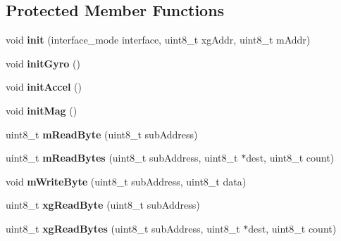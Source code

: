 \subsection*{Protected Member Functions}
\begin{DoxyCompactItemize}
\item 
\mbox{\label{classLSM9DS1_aa4f74e09e93c0133dc30545d4492849e}} 
void {\bfseries init} (interface\+\_\+mode interface, uint8\+\_\+t xg\+Addr, uint8\+\_\+t m\+Addr)
\item 
\mbox{\label{classLSM9DS1_a66a7b02acb28964ffc9362f25988e270}} 
void {\bfseries init\+Gyro} ()
\item 
\mbox{\label{classLSM9DS1_a143ff5abf4f7ba8e1c42325859106f84}} 
void {\bfseries init\+Accel} ()
\item 
\mbox{\label{classLSM9DS1_a492aa6edcf891f273d932636e3cc470d}} 
void {\bfseries init\+Mag} ()
\item 
\mbox{\label{classLSM9DS1_ae4e470321567e4f93fc09f4cc6cd9efa}} 
uint8\+\_\+t {\bfseries m\+Read\+Byte} (uint8\+\_\+t sub\+Address)
\item 
\mbox{\label{classLSM9DS1_ab76297373f1d5306ec1e31796ec5ec24}} 
uint8\+\_\+t {\bfseries m\+Read\+Bytes} (uint8\+\_\+t sub\+Address, uint8\+\_\+t $\ast$dest, uint8\+\_\+t count)
\item 
\mbox{\label{classLSM9DS1_afc171c924102c97fa1d88fa7f48bd167}} 
void {\bfseries m\+Write\+Byte} (uint8\+\_\+t sub\+Address, uint8\+\_\+t data)
\item 
\mbox{\label{classLSM9DS1_af7f9789df6f0178764c815a3380c202a}} 
uint8\+\_\+t {\bfseries xg\+Read\+Byte} (uint8\+\_\+t sub\+Address)
\item 
\mbox{\label{classLSM9DS1_a0a5745b603a751b50317cd2551e06cac}} 
uint8\+\_\+t {\bfseries xg\+Read\+Bytes} (uint8\+\_\+t sub\+Address, uint8\+\_\+t $\ast$dest, uint8\+\_\+t count)
\item 
\mbox{\label{classLSM9DS1_a263eed4b52ad087a1195755c6ba49e62}} 

\end{DoxyCompactItemize}
